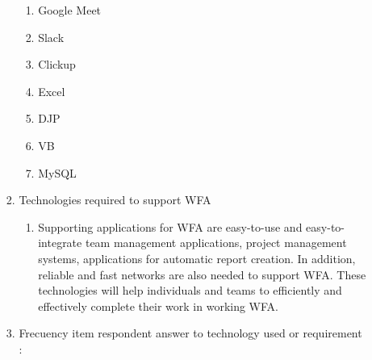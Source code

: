 \documentclass[conference]{IEEEtran}
\begin{document}
\begin{itemize}
\begin{enumerate}
\begin{enumerate}
 
\begin{enumerate}
\item Google Meet
\item Slack
\item Clickup
\item Excel
\item DJP
\item VB
\item MySQL
\end{enumerate}
\item Technologies required to support WFA
\begin{enumerate}
\item[] Supporting applications for WFA are easy-to-use and easy-to-integrate team management applications, project management systems, applications for automatic report creation. In addition, reliable and fast networks are also needed to support WFA. These technologies will help individuals and teams to efficiently and effectively complete their work in working WFA.
\end{enumerate}
\item Frecuency item respondent answer to technology used or requirement :



\end{enumerate}
\end{enumerate}
\end{itemize}
\end{document}
